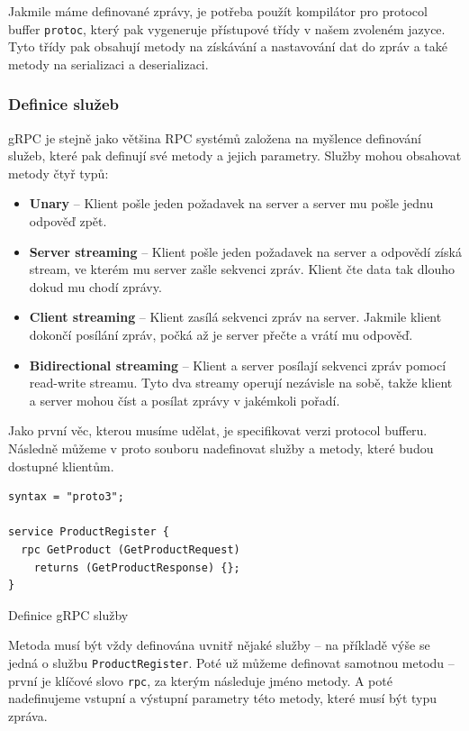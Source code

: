 \documentclass[thesis=M,czech]{FITthesis}[2019/12/23]
\begin{document}
Jakmile máme definované zprávy, je potřeba použít kompilátor pro protocol buffer \texttt{protoc}, který pak vygeneruje přístupové třídy v našem zvoleném jazyce. Tyto třídy pak obsahují metody na získávání a nastavování dat do zpráv a také metody na serializaci a deserializaci.

\subsubsection*{Definice služeb}
gRPC je stejně jako většina RPC systémů založena na myšlence definování služeb, které pak definují své metody a jejich parametry. Služby mohou obsahovat metody čtyř typů:

\begin{itemize}
    \item \textbf{Unary} -- Klient pošle jeden požadavek na server a server mu pošle jednu odpověď zpět.
    \item \textbf{Server streaming} -- Klient pošle jeden požadavek na server a odpovědí získá stream, ve kterém mu server zašle sekvenci zpráv. Klient čte data tak dlouho dokud mu chodí zprávy.
    \item \textbf{Client streaming} -- Klient zasílá sekvenci zpráv na server. Jakmile klient dokončí posílání zpráv, počká až je server přečte a vrátí mu odpověď.
    \item \textbf{Bidirectional streaming} -- Klient a server posílají sekvenci zpráv pomocí read-write streamu. Tyto dva streamy operují nezávisle na sobě, takže klient a server mohou číst a posílat zprávy v jakémkoli pořadí.
\end{itemize}

Jako první věc, kterou musíme udělat, je specifikovat verzi protocol bufferu. Následně můžeme v proto souboru nadefinovat služby a metody, které budou dostupné klientům.

\begin{listing}[H]
\begin{verbatim}
syntax = "proto3";

service ProductRegister {
  rpc GetProduct (GetProductRequest) 
    returns (GetProductResponse) {};
}
\end{verbatim}
\caption{Definice gRPC služby}
\label{lst:grpc_service}
\end{listing}

Metoda musí být vždy definována uvnitř nějaké služby -- na příkladě  výše se jedná o službu \texttt{ProductRegister}. Poté už můžeme definovat samotnou metodu -- první je klíčové slovo \texttt{rpc}, za kterým následuje jméno metody. A poté nadefinujeme vstupní a výstupní parametry této metody, které musí být typu zpráva.
\end{document}
